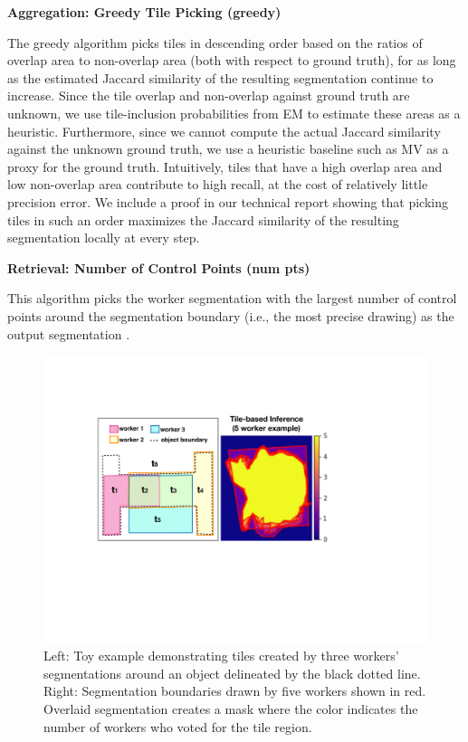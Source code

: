 \documentclass[letterpaper]{article}
\newcommand{\stitle}[1]{\noindent \textbf{#1}}
\begin{document}
\stitle{Aggregation: Greedy Tile Picking (greedy)} 
\par \noindent The greedy algorithm picks tiles in descending order based on the ratios of overlap area to non-overlap area (both with respect to ground truth), for as long as the estimated Jaccard similarity of the resulting segmentation continue to increase. Since the tile overlap and non-overlap against ground truth are unknown, we use tile-inclusion probabilities from EM to estimate these areas as a heuristic. Furthermore, since we cannot compute the actual Jaccard similarity against the unknown ground truth, we use a heuristic baseline such as MV as a proxy for the ground truth. Intuitively, tiles that have a high overlap area and low non-overlap area contribute to high recall, at the cost of relatively little precision error. We include a proof in our technical report showing that picking tiles in such an order maximizes the Jaccard similarity of the resulting segmentation locally at every step. 

\stitle{Retrieval: Number of Control Points (num pts)}
\par \noindent This algorithm picks the worker segmentation with the largest number of control points around the segmentation boundary (i.e., the most precise drawing) as the output segmentation \cite{Vittayakorn2011,Sorokin2008}.

\begin{figure}[h!]
\centering
\includegraphics[width=0.85\linewidth]{plots/tile.pdf}
\caption{Left: Toy example demonstrating tiles created by three workers' segmentations around an object delineated by the black dotted line. Right: Segmentation boundaries drawn by five workers shown in red. Overlaid segmentation creates a mask where the color indicates the number of workers who voted for the tile region.}
\label{tile_demo}
\end{figure}  
\end{document}
